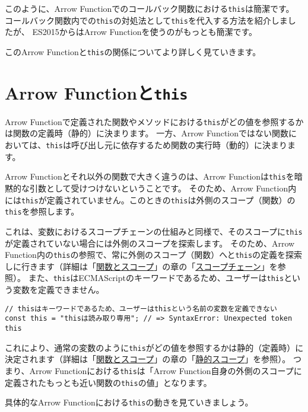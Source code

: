このように、Arrow
Functionでのコールバック関数における\texttt{this}は簡潔です。
コールバック関数内での\texttt{this}の対処法として\texttt{this}を代入する方法を紹介しましたが、
ES2015からはArrow Functionを使うのがもっとも簡潔です。

このArrow
Functionと\texttt{this}の関係についてより詳しく見ていきます。

\hypertarget{arrow-function-this}{%
\section{\texorpdfstring{Arrow
Functionと\texttt{this}}{Arrow Functionとthis}}\label{arrow-function-this}}

Arrow
Functionで定義された関数やメソッドにおける\texttt{this}がどの値を参照するかは関数の定義時（静的）に決まります。
一方、Arrow
Functionではない関数においては、\texttt{this}は呼び出し元に依存するため関数の実行時（動的）に決まります。

Arrow Functionとそれ以外の関数で大きく違うのは、Arrow
Functionは\texttt{this}を暗黙的な引数として受けつけないということです。
そのため、Arrow
Function内には\texttt{this}が定義されていません。このときの\texttt{this}は外側のスコープ（関数）の\texttt{this}を参照します。

これは、変数におけるスコープチェーンの仕組みと同様で、そのスコープに\texttt{this}が定義されていない場合には外側のスコープを探索します。
そのため、Arrow
Function内の\texttt{this}の参照で、常に外側のスコープ（関数）へと\texttt{this}の定義を探索しに行きます（詳細は「\hyperlink{function-and-scope}{関数とスコープ}」の章の「\hyperlink{scope-chain}{スコープチェーン}」を参照）。
また、\texttt{this}はECMAScriptのキーワードであるため、ユーザーは\texttt{this}という変数を定義できません。

\begin{lstlisting}
// thisはキーワードであるため、ユーザーはthisという名前の変数を定義できない
const this = "thisは読み取り専用"; // => SyntaxError: Unexpected token this
\end{lstlisting}

これにより、通常の変数のように\texttt{this}がどの値を参照するかは静的（定義時）に決定されます（詳細は「\hyperlink{function-and-scope}{関数とスコープ}」の章の「\hyperlink{static-scope}{静的スコープ}」を参照）。
つまり、Arrow Functionにおける\texttt{this}は「Arrow
Function自身の外側のスコープに定義されたもっとも近い関数の\texttt{this}の値」となります。

具体的なArrow
Functionにおける\texttt{this}の動きを見ていきましょう。

